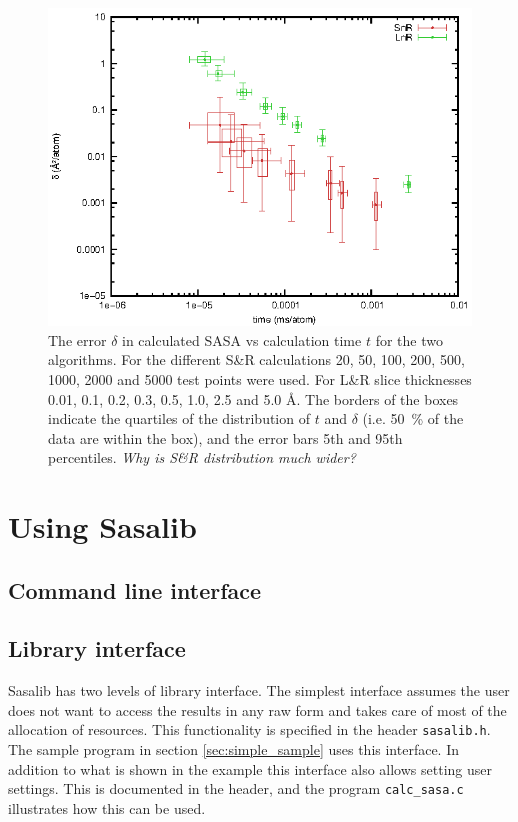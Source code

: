 \documentclass[a4paper,11pt]{article}
\begin{document}
\begin{figure}
  \begin{center}
  \includegraphics{../analysis/plots/precision}
  \caption{The error $\delta$ in calculated SASA vs calculation time
    $t$ for the two algorithms. For the different S\&R calculations
    20, 50, 100, 200, 500, 1000, 2000 and 5000 test points were
    used. For L\&R slice thicknesses 0.01, 0.1, 0.2, 0.3, 0.5, 1.0,
    2.5 and 5.0 Å. The borders of the boxes indicate the quartiles of
    the distribution of $t$ and $\delta$ (i.e. 50~\% of the data are
    within the box), and the error bars 5th and 95th percentiles.
    \emph{Why is S\&R distribution much wider?}
    \label{fig:precision}}
  \end{center}
\end{figure}



\section{Using Sasalib} \label{sec:using}

\subsection{Command line interface}\label{sec:CLI}

\subsection{Library interface}

Sasalib has two levels of library interface. The simplest interface
assumes the user does not want to access the results in any raw form
and takes care of most of the allocation of resources. This
functionality is specified in the header \texttt{sasalib.h}. The
sample program in section \ref{sec:simple_sample} uses this interface.
In addition to what is shown in the example this interface also allows
setting user settings. This is documented in the header, and the program
\texttt{calc\_sasa.c} illustrates how this can be used.
\end{document}
